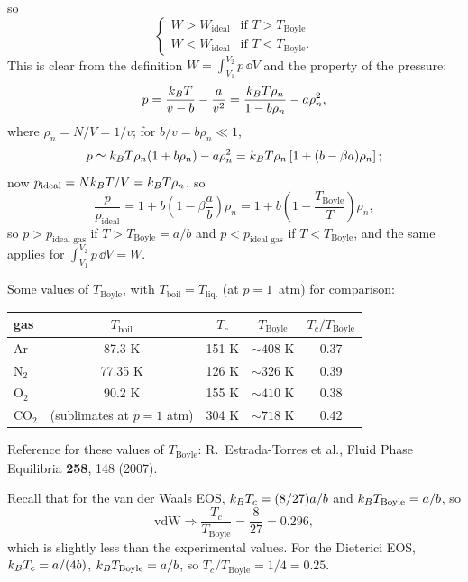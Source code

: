 so
\begin{equation}
  \begin{cases}
    W>W_{\text{ideal}} & \text{if } T>T_{\text{Boyle}}\\
    W<W_{\text{ideal}} & \text{if } T<T_{\text{Boyle}} .
  \end{cases}
\end{equation}
This is clear from the definition $W = \int_{V_1}^{V_2}p\,\dd V$ and the property of the pressure:
\begin{equation}
  p = \frac{k_{B} T}{v-b} - \frac{a}{v^2} = \frac{k_{B} T\rho_n}{1-b\rho_n} - a\rho_n^2,
\end{equation}
where $\rho_n = N/V = 1/v$; for $b/v = b\rho_n\ll 1$,
\begin{equation}
  p\simeq k_{B} T\rho_n(1+b\rho_n) - a\rho_n^2 = k_{B} T\rho_n\left[1+(b-\beta a)\rho_n\right];
\end{equation}
now $p_{\text{ideal}} = Nk_{B} T/V = k_{B} T\rho_n$, so
\begin{equation}
  \frac{p}{p_{\text{ideal}}} = 1 + b\left(1-\beta\frac{a}{b}\right)\rho_n = 1 + b\left(1-\frac{T_{\text{Boyle}}}{T}\right)\rho_n,
\end{equation}
so $p>p_{\text{ideal gas}}$ if $T>T_{\text{Boyle}} = a/b$ and $p<p_{\text{ideal gas}}$ if $T<T_{\text{Boyle}}$, and
the same applies for $\int_{V_1}^{V_2}p\,\dd V = W$.

Some values of $T_{\text{Boyle}}$, with $T_{\text{boil}} = T_{\text{liq.}}$ (at $p = 1$~atm) for comparison:
\begin{center}
\begin{tabular}{lcccc}
  gas & $T_{\text{boil}}$ & $T_c$ & $T_{\text{Boyle}}$ & $T_c/T_{\text{Boyle}}$\\ \hline
  Ar & 87.3 K & 151 K & $\sim 408$ K & 0.37\\
  N$_2$ & 77.35 K & 126 K & $\sim 326$ K & 0.39\\
  O$_2$ & 90.2 K & 155 K & $\sim 410$ K & 0.38\\
  CO$_2$ & (sublimates at $p = 1$ atm) & 304 K & $\sim 718$ K & 0.42
\end{tabular}
\end{center}
Reference for these values of $T_{\text{Boyle}}$: R.~Estrada-Torres et al., Fluid Phase Equilibria \textbf{258}, 148
(2007).

Recall that for the van der Waals EOS, $k_{B} T_c = (8/27)a/b$ and $k_{B} T_{\text{Boyle}} = a/b$, so
\begin{equation}
  \text{vdW}\Rightarrow\frac{T_c}{T_{\text{Boyle}}} = \frac{8}{27} = 0.296,
\end{equation}
which is slightly less than the experimental values. For the Dieterici EOS, $k_{B} T_c = a/(4b)$,
$k_{B} T_{\text{Boyle}} = a/b$, so $T_c/T_{\text{Boyle}} = 1/4 = 0.25$.
